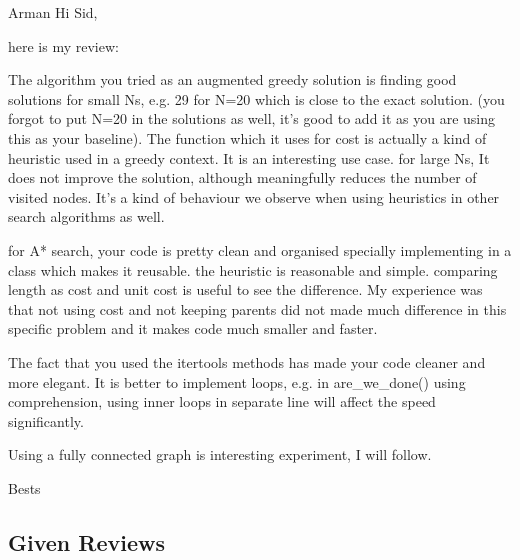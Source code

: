 \begin{tcolorbox}[colback=green!5!white,colframe=green!75!black,code={\singlespacing}]
  Arman
  \tcblower
Hi Sid,

here is my review:

The algorithm you tried as an augmented greedy solution is finding good solutions for small Ns, e.g. 29 for N=20 which is close to the exact solution. (you forgot to put N=20 in the solutions as well, it's good to add it as you are using this as your baseline). The function which it uses for cost is actually a kind of heuristic used in a greedy context. It is an interesting use case. for large Ns, It does not improve the solution, although meaningfully reduces the number of visited nodes. It's a kind of behaviour we observe when using heuristics in other search algorithms as well.

for A* search, your code is pretty clean and organised  specially implementing in a class which makes it reusable. the heuristic is reasonable and simple. comparing length as cost and unit cost is useful to see the difference. My experience was that not using cost and not keeping parents did not made much difference in this specific problem and it makes code much smaller and faster.

The fact that you used the itertools methods has made your code cleaner and more elegant. It is better to implement loops, e.g. in are\_we\_done() using comprehension, using inner loops in separate line will affect the speed significantly.

Using a fully connected graph is interesting experiment, I will follow.

Bests
\end{tcolorbox}

\subsection{Given Reviews}
